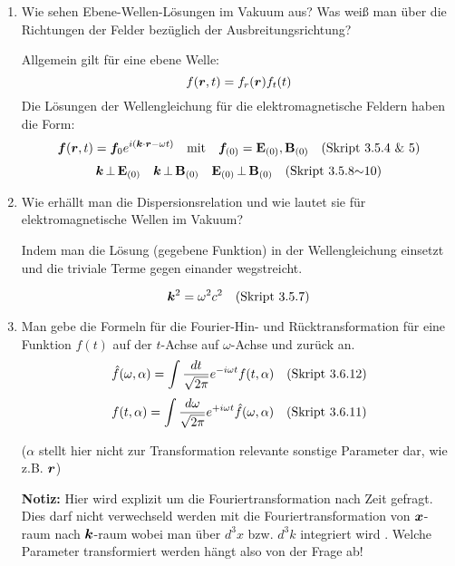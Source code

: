 \begin{enumerate}
  \item Wie sehen Ebene-Wellen-Lösungen im Vakuum aus? Was weiß man %
        über die Richtungen der Felder bezüglich der 
        Ausbreitungsrichtung?
        
        Allgemein gilt für eine ebene Welle:
        $$f(\vb* r , t)=f_r(\vb* r)f_t(t)$$
        Die Lösungen der Wellengleichung für die 
        elektromagnetische Feldern haben die Form:
        \begin{equation*}
          \vb* f(\vb* r, t)=\vb* f_0 e^{i(\vb*k\cdot\vb*r-\omega t)}
          \quad\text{mit}\quad
          \vb* f_{(0)} = \vb E_{(0)}, \vb B_{(0)} \quad\text{(Skript 3.5.4 \& 5)}
        \end{equation*}
        $$\vb* k \,\bot\, \vb E_{(0)} \quad \vb* k\,\bot\,\vb B_{(0)} \quad
        \vb E_{(0)}\,\bot\, \vb B_{(0)}\quad\text{(Skript 3.5.8$\sim$10)}$$

  \item Wie erhällt man die Dispersionsrelation und wie lautet sie für %
        elektromagnetische Wellen im Vakuum?
        \begin{center}
          Indem man die Lösung (gegebene Funktion) in 
          der Wellengleichung einsetzt und die
          triviale Terme gegen einander wegstreicht.
        \end{center}
        \begin{equation*}
          \vb* k^2 = \omega^2 c^2 \quad\text{(Skript 3.5.7)}
        \end{equation*}

  \item Man gebe die Formeln für die Fourier-Hin- und Rücktransformation %
        für eine Funktion $f(t)$ auf der $t$-Achse auf $\omega$-Achse und
        zurück an.
        $$\hat f(\omega, \alpha)=\int \frac{dt}{\sqrt{2\pi}}
              e^{-i\omega t}f(t, \alpha)\quad\text{(Skript 3.6.12)}$$
        $$f(t, \alpha)=\int \frac{d\omega}{\sqrt{2\pi}}
                         e^{+i\omega t}\hat f(\omega, \alpha)
                        \quad\text{(Skript 3.6.11)}$$
        \begin{center}
          ($\alpha$ stellt hier nicht zur Transformation relevante 
          sonstige Parameter dar, wie z.B. $\vb* r$)
        \end{center}
        \textbf{Notiz:} Hier wird explizit um die Fouriertransformation 
        nach Zeit gefragt. Dies darf nicht verwechseld werden mit die 
        Fouriertransformation von $\vb* x$-raum nach $\vb* k$-raum 
        wobei man über
        $d^3x$ bzw. $d^3k$ integriert wird .
        Welche Parameter transformiert werden hängt also von der Frage 
        ab!


\end{enumerate}
